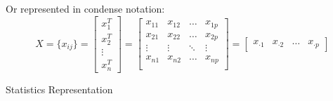     Or represented in condense notation:
    \begin{equation}
        X=\{x_{ij}\}=
        \begin{bmatrix}
            x_1^T\\x_2^T\\ \vdots \\ x_n^T
        \end{bmatrix}
        =
        \begin{bmatrix}
            x_{11}&x_{12}&\ldots&x_{1p}\\
            x_{21}&x_{22}&\ldots&x_{2p}\\
            \vdots&\vdots&\ddots&\vdots\\
            x_{n1}&x_{n2}&\ldots&x_{np}\\
        \end{bmatrix} 
        =
        \begin{bmatrix}
            x_{\cdot 1}&x_{\cdot 2}&\ldots &x_{\cdot p}
        \end{bmatrix}
    \end{equation}
\begin{point}
    \hypertarget{StatisticsRepresentation}{Statistics Representation}
\end{point}

